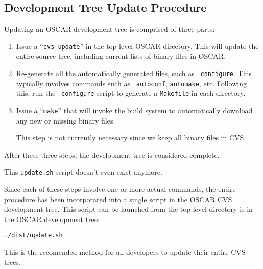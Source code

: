 
\subsection{Development Tree Update Procedure}

Updating an OSCAR development tree is comprised of three parts:

\begin{enumerate}
\item Issue a ``{\tt cvs update}'' in the top-level OSCAR directory.
  This will update the entire source tree, including current lists of
  binary files in OSCAR.
  
\item Re-generate all the automatically generated files, such as {\tt
    configure}.  This typically involves commands such as {\tt
    autoconf}, {\tt automake}, etc.  Following this, run the {\tt
    configure} script to generate a {\tt Makefile} in each directory.

\item Issue a ``{\tt make}'' that will invoke the build system to
  automatically download any new or missing binary files.

{\Huge This step is not currently necessary since we keep all binary
  files in CVS.}
\end{enumerate}

After these three steps, the development tree is considered complete.

{\Huge This {\tt update.sh} script doesn't even exist anymore.}

Since each of these steps involve one or more actual commands, the
entire procedure has been incorporated into a single script in the
OSCAR CVS development tree.  This script can be launched from the
top-level directory is in the OSCAR development tree:

\vspace{10pt}
\centerline{\tt ./dist/update.sh}
\vspace{10pt}

This is the recomended method for all developers to update their
entire CVS trees.

